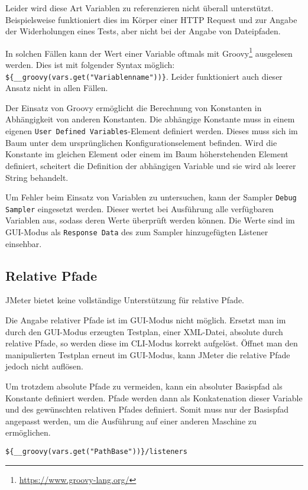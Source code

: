 Leider wird diese Art Variablen zu referenzieren nicht überall unterstützt.
Beispielsweise funktioniert dies im Körper einer HTTP Request und zur Angabe der Widerholungen eines Tests,
aber nicht bei der Angabe von Dateipfaden.

In solchen Fällen kann der Wert einer Variable oftmals mit Groovy\footnote{\url{https://www.groovy-lang.org/}} ausgelesen werden.
Dies ist mit folgender Syntax möglich: \texttt{\$\{\_\_groovy(vars.get("Variablenname"))\}}.
Leider funktioniert auch dieser Ansatz nicht in allen Fällen.

Der Einsatz von Groovy ermöglicht die Berechnung von Konstanten in Abhängigkeit von anderen Konstanten.
Die abhängige Konstante muss in einem eigenen \texttt{User Defined Variables}-Element definiert werden.
Dieses muss sich im Baum unter dem ursprünglichen Konfigurationselement befinden.
Wird die Konstante im gleichen Element oder einem im Baum höherstehenden Element definiert,
scheitert die Definition der abhängigen Variable und sie wird als leerer String behandelt.

Um Fehler beim Einsatz von Variablen zu untersuchen,
kann der Sampler \texttt{Debug Sampler} eingesetzt werden.
Dieser wertet bei Ausführung alle verfügbaren Variablen aus, sodass deren Werte überprüft werden können.
Die Werte sind im GUI-Modus als \texttt{Response Data} des zum Sampler hinzugefügten Listener einsehbar.

\subsection{Relative Pfade}

JMeter bietet keine vollständige Unterstützung für relative Pfade.

Die Angabe relativer Pfade ist im GUI-Modus nicht möglich.
Ersetzt man im durch den GUI-Modus erzeugten Testplan, einer XML-Datei, absolute durch relative Pfade,
so werden diese im CLI-Modus korrekt aufgelöst.
Öffnet man den manipulierten Testplan erneut im GUI-Modus,
kann JMeter die relative Pfade jedoch nicht auflösen.

Um trotzdem absolute Pfade zu vermeiden,
kann ein absoluter Basispfad als Konstante definiert werden.
Pfade werden dann als Konkatenation dieser Variable und des gewünschten relativen Pfades definiert.
Somit muss nur der Basispfad angepasst werden, um die Ausführung auf einer anderen Maschine zu ermöglichen.

\begin{lstlisting}[caption=Workaround zur Angabe relativer Pfade]
    ${__groovy(vars.get("PathBase"))}/listeners
\end{lstlisting}
